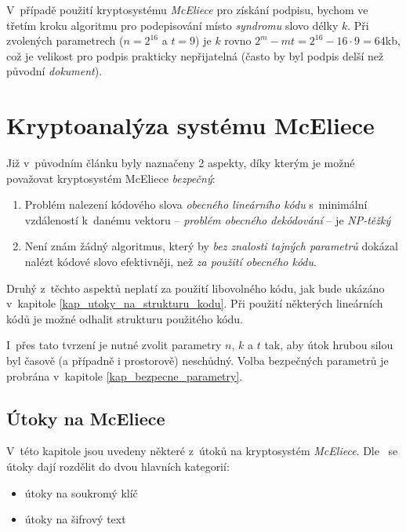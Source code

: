 \documentclass[thesis=M,czech,hidelinks]{FITthesis}[2012/06/26]
\newcommand{\0}{{\textcolor[gray]{0.80}{0}}}
\begin{document}
V~případě použití kryptosystému \emph{McEliece} pro získání podpisu, bychom ve
třetím kroku algoritmu pro podepisování místo \emph{syndromu} slovo délky $k$.
Při zvolených parametrech ($n=2^{16}$ a $t=9$) je $k$ rovno $2^m - m t = 2^{16}
- 16 \cdot 9 = 64$\;kb, což je velikost pro podpis prakticky nepřijatelná (často
by byl podpis delší než původní \emph{dokument}).

\clearpage


\section{Kryptoanalýza systému McEliece}

Již v~původním článku \cite{McEliece} byly naznačeny 2 aspekty, díky kterým je
možné považovat kryptosystém McEliece \emph{bezpečný}:


\begin{enumerate}
    \item Problém nalezení kódového slova \emph{obecného lineárního kódu}
        s~minimální vzdáleností k~danému vektoru
        -- \emph{problém obecného dekódování} -- je \emph{NP-těžký}
        \cite{Berlekamp1}
    \item Není znám žádný algoritmus, který by \emph{bez znalosti tajných parametrů}
        dokázal nalézt kódové slovo efektivněji, než \emph{za použití obecného kódu}.
\end{enumerate}


Druhý z~těchto aspektů neplatí za použití libovolného kódu, jak bude ukázáno
v~kapitole \ref{kap_utoky_na_strukturu_kodu}. Při použití některých lineárních
kódů je možné odhalit strukturu použitého kódu.

I~přes tato tvrzení je nutné zvolit parametry $n$, $k$ a $t$ tak, aby útok
hrubou silou byl časově (a případně i prostorově) neschůdný. Volba bezpečných
parametrů je probrána v~kapitole \ref{kap_bezpecne_parametry}.


\subsection{Útoky na McEliece}

V~této kapitole jsou uvedeny některé z~útoků na kryptosystém \emph{McEliece}.
Dle~\cite{Engelbert} se útoky dají rozdělit do dvou hlavních kategorií:

\begin{itemize}
    \item útoky na soukromý klíč
    \item útoky na šifrový text
\end{itemize}
\end{document}
